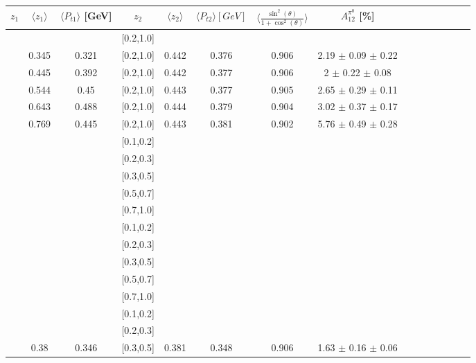\begin{table}[H]\tiny
\centering
\renewcommand{\arraystretch}{1.5}
\begin{tabular}{|c| c| c| c| c| c| c| c| c| c|c| c| c| c| c|}
\hline
$z_1$ & $\langle  z_1\rangle$ & $\langle  P_{t1} \rangle$ [GeV] & $z_2$ & $\langle  z_2 \rangle$ & $\langle  P_{t2}  \rangle [GeV] $& $\langle\frac{\sin^2(\theta)}{1+\cos^2(\theta)}\rangle$ & $A_{12}^{\pi^0}$ [\%]  \\ \hline
[0.2,0.3]	&		&		&	[0.2,1.0]	&		&		&		&							\\ \hline
[0.3,0.4]	&	0.345	&	0.321	&	[0.2,1.0]	&	0.442	&	0.376	&	0.906	& 2.19  $\pm$ 0.09  $\pm$ 0.22    	\\ \hline
[0.4,0.5]	&	0.445	&	0.392	&	[0.2,1.0]	&	0.442	&	0.377	&	0.906	& 2  $\pm$ 0.22  $\pm$ 0.08       	\\ \hline
[0.5,0.6]	&	0.544	&	0.45	&	[0.2,1.0]	&	0.443	&	0.377	&	0.905	& 2.65  $\pm$ 0.29  $\pm$ 0.11    	\\ \hline
[0.6,0.7]	&	0.643	&	0.488	&	[0.2,1.0]	&	0.444	&	0.379	&	0.904	& 3.02  $\pm$ 0.37  $\pm$ 0.17    	\\ \hline
[0.7,1.0]	&	0.769	&	0.445	&	[0.2,1.0]	&	0.443	&	0.381	&	0.902	& 5.76  $\pm$ 0.49  $\pm$ 0.28    	\\ \hline
\hline
[0.1,0.2]	&		&		&	[0.1,0.2]	&		&		&		&							\\ \hline
[0.1,0.2]	&		&		&	[0.2,0.3]	&		&		&		&							\\ \hline
[0.1,0.2]	&		&		&	[0.3,0.5]	&		&		&		&							\\ \hline
[0.1,0.2]	&		&		&	[0.5,0.7]	&		&		&		&							\\ \hline
[0.1,0.2]	&		&		&	[0.7,1.0]	&		&		&		&							\\ \hline
\hline
[0.2,0.3]	&		&		&	[0.1,0.2]	&		&		&		&							\\ \hline
[0.2,0.3]	&		&		&	[0.2,0.3]	&		&		&		&							\\ \hline
[0.2,0.3]	&		&		&	[0.3,0.5]	&		&		&		&							\\ \hline
[0.2,0.3]	&		&		&	[0.5,0.7]	&		&		&		&							\\ \hline
[0.2,0.3]	&		&		&	[0.7,1.0]	&		&		&		&							\\ \hline
\hline
[0.3,0.5]	&		&		&	[0.1,0.2]	&		&		&		&							\\ \hline
[0.3,0.5]	&		&		&	[0.2,0.3]	&		&		&		&							\\ \hline
[0.3,0.5]	&	0.38	&	0.346	&	[0.3,0.5]	&	0.381	&	0.348	&	0.906	& 1.63  $\pm$ 0.16  $\pm$ 0.06  	\\ \hline

\end{tabular}
\end{table}
